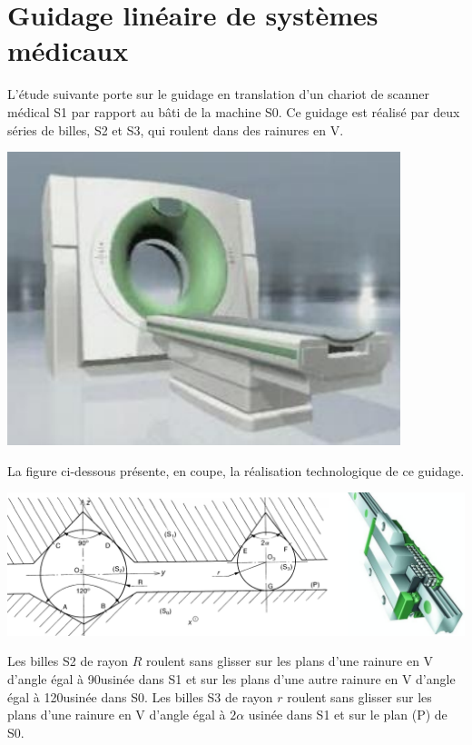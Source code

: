 \section*{Guidage linéaire de systèmes médicaux}
\setcounter{subparagraph}{0}

L’étude suivante porte sur le guidage en translation d’un chariot 
de scanner médical S1 par rapport au bâti de la machine S0. Ce 
guidage est réalisé par deux séries de billes, S2 et S3, qui roulent 
dans des rainures en V. 

\begin{center}
\includegraphics[width=.95\textwidth]{images/fig_04}
\end{center}


La figure ci-dessous présente, en coupe, la réalisation technologique de ce guidage. 

\begin{center}
\includegraphics[width=.85\textwidth]{images/fig_05}
\end{center}

Les billes S2 de rayon $R$ roulent sans glisser sur les plans d’une rainure en V d’angle égal à 90\textdegree usinée dans 
S1 et sur les plans d’une autre rainure en V d’angle égal à 120\textdegree usinée dans S0. 
Les billes S3 de rayon $r$ roulent sans glisser sur les plans d’une rainure en V d’angle égal à 
$2\alpha$ usinée dans 
S1 et sur le plan (P) de S0. 

